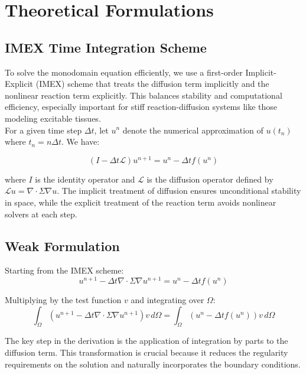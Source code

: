 \section{Theoretical Formulations}

\subsection{IMEX Time Integration Scheme}

To solve the monodomain equation efficiently, we use a first-order Implicit-Explicit (IMEX) scheme that treats the diffusion term implicitly and the nonlinear reaction term explicitly. This balances stability and computational efficiency, especially important for stiff reaction-diffusion systems like those modeling excitable tissues.\\
For a given time step $\Delta t$, let $u^n$ denote the numerical approximation of $u(t_n)$ where $t_n = n\Delta t$. We have:

\begin{equation}
(I - \Delta t \mathcal{L}) u^{n+1} = u^n - \Delta t f(u^n)
\end{equation}

where $I$ is the identity operator and $\mathcal{L}$ is the diffusion operator defined by $\mathcal{L}u = \nabla \cdot \Sigma \nabla u$.
The implicit treatment of diffusion ensures unconditional stability in space, while the explicit treatment of the reaction term avoids nonlinear solvers at each step.

\subsection{Weak Formulation}

Starting from the IMEX scheme:
\begin{equation}
u^{n+1} - \Delta t \nabla \cdot \Sigma \nabla u^{n+1} = u^n - \Delta t f(u^n)
\end{equation}

Multiplying by the test function $v$ and integrating over $\Omega$:
\begin{equation}
\int_\Omega \left(u^{n+1} - \Delta t \nabla \cdot \Sigma \nabla u^{n+1}\right) v \, d\Omega = \int_\Omega \left(u^n - \Delta t f(u^n)\right) v \, d\Omega
\end{equation}

The key step in the derivation is the application of integration by parts to the diffusion term. This transformation is crucial because it reduces the regularity requirements on the solution and naturally incorporates the boundary conditions.

